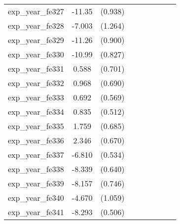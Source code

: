 {\begin{tabular}{l*{4}{cc}}
exp\_year\_fe327&   -11.35\sym{***}&  (0.938)&                  &         &                  &         &                  &         \\
exp\_year\_fe328&   -7.003\sym{***}&  (1.264)&                  &         &                  &         &                  &         \\
exp\_year\_fe329&   -11.26\sym{***}&  (0.900)&                  &         &                  &         &                  &         \\
exp\_year\_fe330&   -10.99\sym{***}&  (0.827)&                  &         &                  &         &                  &         \\
exp\_year\_fe331&    0.588         &  (0.701)&                  &         &                  &         &                  &         \\
exp\_year\_fe332&    0.968         &  (0.690)&                  &         &                  &         &                  &         \\
exp\_year\_fe333&    0.692         &  (0.569)&                  &         &                  &         &                  &         \\
exp\_year\_fe334&    0.835         &  (0.512)&                  &         &                  &         &                  &         \\
exp\_year\_fe335&    1.759\sym{*}  &  (0.685)&                  &         &                  &         &                  &         \\
exp\_year\_fe336&    2.346\sym{***}&  (0.670)&                  &         &                  &         &                  &         \\
exp\_year\_fe337&   -6.810\sym{***}&  (0.534)&                  &         &                  &         &                  &         \\
exp\_year\_fe338&   -8.339\sym{***}&  (0.640)&                  &         &                  &         &                  &         \\
exp\_year\_fe339&   -8.157\sym{***}&  (0.746)&                  &         &                  &         &                  &         \\
exp\_year\_fe340&   -4.670\sym{***}&  (1.059)&                  &         &                  &         &                  &         \\
exp\_year\_fe341&   -8.293\sym{***}&  (0.506)&                  &         &                  &         &                  &         \\

\end{tabular}}
